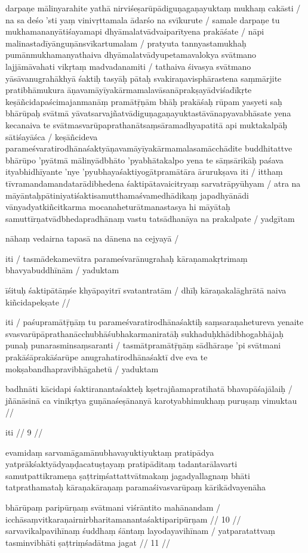darpaṇe mālinyarahite yathā nirviśeṣarūpādiguṇagaṇayuktaṃ mukhaṃ cakāsti  / na sa deśo 'sti yaṃ vinivṛttamala ādarśo na svīkurute  / samale darpaṇe tu mukhamananyātiśayamapi dhyāmalatvādvaiparītyena prakāśate  / nāpi malinastadīyānguṇānsvīkartumalam  / pratyuta tannyastamukhaḥ pumānmukhamanyathaiva dhyāmalatvādyupetamavalokya svātmano lajjāmāvahati vikṛtaṃ madvadanamiti  / tathaiva śivasya svātmano yāsāvanugrahākhyā śaktiḥ tasyāḥ pātaḥ svakiraṇavisphārastena saṃmārjite pratibhāmukura āṇavamāyīyakārmamalavāsanāprakṣayādviśadīkṛte keṣāñcidapaścimajanmanāṃ pramātṝṇām bhāḥ prakāśaḥ rūpam yasyeti saḥ bhārūpaḥ svātmā yāvatsarvajñatvādiguṇagaṇayuktastāvānapyavabhāsate yena kecanaiva te svātmasvarūpaprathanātsaṃsāramadhyapatitā api muktakalpāḥ sātiśayāśca  / keṣāñcideva parameśvaratirodhānaśaktyāṇavamāyīyakārmamalasamācchādite buddhitattve bhārūpo 'pyātmā mālinyādbhāto 'pyabhātakalpo yena te sāṃsārikāḥ paśava ityabhidhīyante 'nye 'pyubhayaśaktiyogātpramātāra ārurukṣava iti  / itthaṃ tīvramandamandatarādibhedena śaktipātavaicitryaṃ sarvatrāpyūhyam  / atra na māyāntaḥpātiniyatiśaktisamutthamaśvamedhādikaṃ japadhyānādi vānyadyatkiñcitkarma mocanaheturātmanastasya hi māyātaḥ samuttīrṇatvādbhedapradhānaṃ vastu tatsādhanāya na prakalpate  / yadgītam

nāhaṃ vedairna tapasā na dānena na cejyayā  /

iti  / tasmādekamevātra parameśvarānugrahaḥ kāraṇamakṛtrimaṃ bhavyabuddhīnām  / yaduktam

īśituḥ śaktipātāṃśe khyāpayitrī svatantratām  /
dhīḥ kāraṇakalāghrātā naiva kiñcidapekṣate  //

iti  / paśupramātṝṇāṃ tu parameśvaratirodhānaśaktiḥ saṃsaraṇahetureva yenaite svasvarūpāprathanācchubhāśubhakarmaniratāḥ sukhaduḥkhādibhogabhājaḥ punaḥ punarasminsaṃsaranti  / tasmātpramātṝṇāṃ sādhāraṇe 'pi svātmani prakāśāprakāśarūpe anugrahatirodhānaśaktī dve eva te mokṣabandhapravibhāgahetū  / yaduktam

badhnāti kācidapi śaktiranantaśakteḥ kṣetrajñamapratihatā bhavapāśajālaiḥ  /
jñānāsinā ca vinikṛtya guṇānaśeṣānanyā karotyabhimukhaṃ puruṣaṃ vimuktau  //

iti  // 9  //

evamidaṃ sarvamāgamānubhavayuktiyuktaṃ pratipādya yatprākśaktyādyaṇḍacatuṣṭayaṃ pratipāditaṃ tadantarālavarti samutpattikrameṇa ṣaṭtriṃśattattvātmakaṃ jagadyallagnaṃ bhāti tatprathamataḥ kāraṇakāraṇaṃ paramaśivasvarūpaṃ kārikādvayenāha

bhārūpaṃ paripūrṇaṃ svātmani viśrāntito mahānandam  /
icchāsaṃvitkaraṇairnirbharitamanantaśaktiparipūrṇam  // 10  //
sarvavikalpavihīnaṃ śuddhaṃ śāntaṃ layodayavihīnam  /
yatparatattvaṃ tasminvibhāti ṣaṭtriṃśadātma jagat  // 11  //

